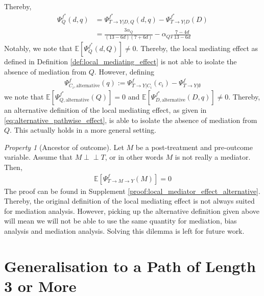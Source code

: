 \documentclass{article}
\theoremstyle{plain}
\theoremstyle{definition}
\theoremstyle{remark}
\newcommand{\effect}{\Psi}
\theoremstyle{mystyle}
\newtheorem{property}{Property}[section]
\newcommand{\indep}{\perp\!\!\!\!\perp}
\begin{document}
Thereby,
\begin{align*}
    \effect^{f^*}_{Q}(d,q)
    &= \effect^{f^*}_{T \rightarrow Y | D, Q}(d,q) - \effect^{f^*}_{T \rightarrow Y | D}(D) \\
    &= \frac{3\alpha_Q}{(13 - 6d)(7 + 6d)} - \alpha_{QT}\frac{7 - 4d}{13 - 6d}
\end{align*}
Notably, we note that $\mathbb{E}[\effect^{f^*}_{Q}(d,Q)] \neq 0$. Thereby, the local mediating effect as defined in Definition \ref{def:local_mediating_effect} is not able to isolate the absence of mediation from $Q$. However, defining
\begin{align} \label{eq:alternative_pathwise_effect}
    \effect^{f}_{C_i, \text{alternative}}(q) := \effect^{f}_{T \rightarrow Y | C_i}(c_i) - \effect^{f}_{T \rightarrow Y | \emptyset}
\end{align}
we note that $\mathbb{E}[\effect^{f^*}_{Q, \text{alternative}}(Q)] = 0$ and $\mathbb{E}[\effect^{f^*}_{D, \text{alternative}}(D,q)] \neq 0$. Thereby, an alternative definition of the local mediating effect, as given in \ref{eq:alternative_pathwise_effect}, is able to isolate the absence of mediation from $Q$. This actually holds in a more general setting.
\begin{property}[Ancestor of outcome] \label{prop:local_mediator_effect_alternative} Let $M$ be a post-treatment and pre-outcome variable. %
Assume that $M \indep T$, or in other words $M$ is not really a mediator. Then, 
\begin{align*}
\mathbb{E}[\effect^f_{T \rightarrow M \rightarrow Y}(M)] = 0
\end{align*}
The proof can be found in Supplement \ref{proof:local_mediator_effect_alternative}. Thereby, the original definition of the local mediating effect is not always suited for mediation analysis. However, picking up the alternative definition given above will mean we will not be able to use the same quantity for mediation, bias analysis and mediation analysis. Solving this dilemma is left for future work.

\end{property}

\section{Generalisation to a Path of Length 3 or More}
\label{sec:generalisation}
\end{document}
